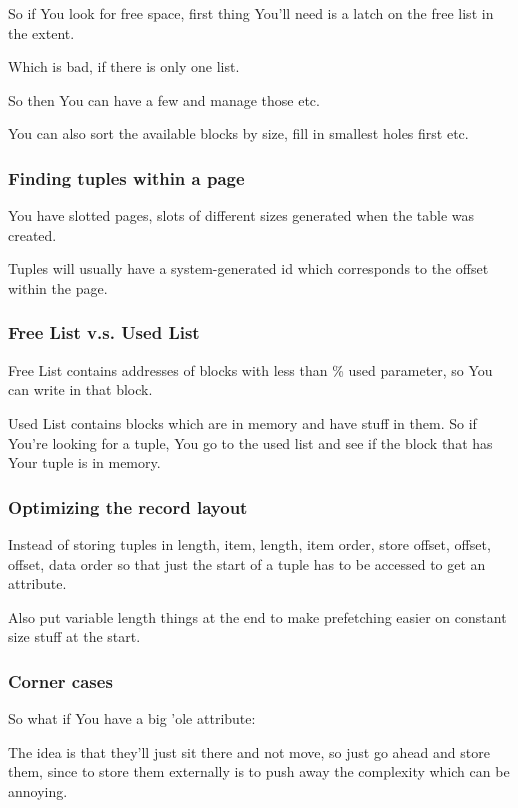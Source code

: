 \documentclass{article}
\begin{document}
				So if You look for free space, first thing You'll need is a latch on the free list in the extent.
				
				Which is bad, if there is only one list.
				
				So then You can have a few and manage those etc.
				
				You can also sort the available blocks by size, fill in smallest holes first etc.
				
			\subsubsection{Finding tuples within a page}
			
				You have slotted pages, slots of different sizes generated when the table was created.
				
				Tuples will usually have a system-generated id which corresponds to the offset within the page.
				
			\subsubsection{Free List v.s. Used List}
			
				Free List contains addresses of blocks with less than \% used parameter, so You can write in that block.
				
				Used List contains blocks which are in memory and have stuff in them. So if You're looking for a tuple, You go to the used list and see if the block that has Your tuple is in memory.
				
			\subsubsection{Optimizing the record layout}
			
				Instead of storing tuples in length, item, length, item order, store offset, offset, offset, data order so that just the start of a tuple has to be accessed to get an attribute.
				
				Also put variable length things at the end to make prefetching easier on constant size stuff at the start.
				
			\subsubsection{Corner cases}
			
				So what if You have a big 'ole attribute:
				
				The idea is that they'll just sit there and not move, so just go ahead and store them, since to store them externally is to push away the complexity which can be annoying.
				
\end{document}
